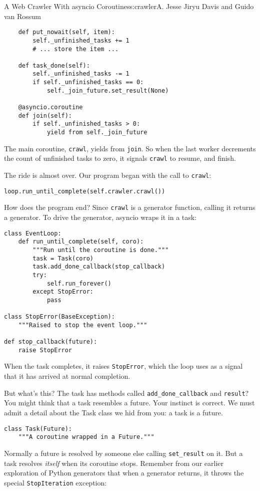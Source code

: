 \begin{aosachapter}{A Web Crawler With asyncio Coroutines}{s:crawler}{A. Jesse Jiryu Davis and Guido van Rossum}
\begin{verbatim}
    def put_nowait(self, item):
        self._unfinished_tasks += 1
        # ... store the item ...

    def task_done(self):
        self._unfinished_tasks -= 1
        if self._unfinished_tasks == 0:
            self._join_future.set_result(None)

    @asyncio.coroutine
    def join(self):
        if self._unfinished_tasks > 0:
            yield from self._join_future
\end{verbatim}

The main coroutine, \texttt{crawl}, yields from \texttt{join}. So when
the last worker decrements the count of unfinished tasks to zero, it
signals \texttt{crawl} to resume, and finish.

The ride is almost over. Our program began with the call to
\texttt{crawl}:

\begin{verbatim}
loop.run_until_complete(self.crawler.crawl())
\end{verbatim}

How does the program end? Since \texttt{crawl} is a generator function,
calling it returns a generator. To drive the generator, asyncio wraps it
in a task:

\begin{verbatim}
class EventLoop:
    def run_until_complete(self, coro):
        """Run until the coroutine is done."""
        task = Task(coro)
        task.add_done_callback(stop_callback)
        try:
            self.run_forever()
        except StopError:
            pass

class StopError(BaseException):
    """Raised to stop the event loop."""

def stop_callback(future):
    raise StopError
\end{verbatim}

When the task completes, it raises \texttt{StopError}, which the loop
uses as a signal that it has arrived at normal completion.

But what's this? The task has methods called
\texttt{add\_done\_callback} and \texttt{result}? You might think that a
task resembles a future. Your instinct is correct. We must admit a
detail about the Task class we hid from you: a task is a future.

\begin{verbatim}
class Task(Future):
    """A coroutine wrapped in a Future."""
\end{verbatim}

Normally a future is resolved by someone else calling
\texttt{set\_result} on it. But a task resolves \emph{itself} when its
coroutine stops. Remember from our earlier exploration of Python
generators that when a generator returns, it throws the special
\texttt{StopIteration} exception:


\end{aosachapter}
